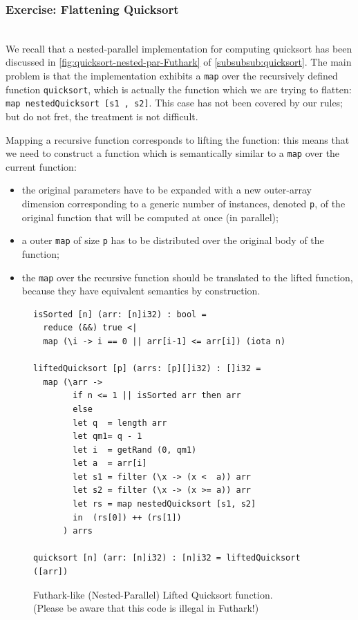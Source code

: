 \documentclass[acmsmall,review]{acmart}\settopmatter{printfolios=true,printccs=false,printacmref=false}
\begin{document}
\newpage
\subsubsection{Exercise: Flattening Quicksort}
\label{exercise:flat-quicksort}
$\mbox{ }$\\

We recall that a nested-parallel implementation for computing quicksort 
has been discussed in \cref{fig:quicksort-nested-par-Futhark}
of \cref{subsubsub:quicksort}.  The main problem is that the
implementation exhibits a \lstinline{map} over the recursively
defined function {\tt quicksort}, which is actually the function 
which we are trying to flatten: \lstinline{map nestedQuicksort [s1 , s2]}.
This case has not been covered by our rules; but do not fret,
the treatment is not difficult. 

Mapping a recursive function corresponds to lifting the function:
this means that we need to construct a function which is semantically
similar to a \lstinline{map} over the current function:
\begin{itemize}
    \item the original parameters have to be expanded with
        a new outer-array dimension corresponding to a generic
        number of instances, denoted {\tt p}, of the original
        function that will be computed at once (in parallel);
    \item a outer \lstinline{map} of size {\tt p} has to be
        distributed over the original body of the function;
    \item the \lstinline{map} over the recursive function
        should be translated to the lifted function, because
        they have equivalent semantics by construction.
\end{itemize}

\begin{figure}
\begin{lstlisting}[mathescape=true]
isSorted [n] (arr: [n]i32) : bool =
  reduce (&&) true <|
  map (\i -> i == 0 || arr[i-1] <= arr[i]) (iota n)

liftedQuicksort [p] (arrs: [p][]i32) : []i32 =
  map (\arr ->
        if n <= 1 || isSorted arr then arr
        else
        let q  = length arr
        let qm1= q - 1
        let i  = getRand (0, qm1)
        let a  = arr[i]
        let s1 = filter (\x -> (x <  a)) arr
        let s2 = filter (\x -> (x >= a)) arr
        let rs = map nestedQuicksort [s1, s2]
        in  (rs[0]) ++ (rs[1])
      ) arrs

quicksort [n] (arr: [n]i32) : [n]i32 = liftedQuicksort ([arr]) 
\end{lstlisting}\vspace{-4ex}
\caption{Futhark-like (Nested-Parallel) Lifted Quicksort function.\\
        (Please be aware that this code is illegal in Futhark!)}
\label{fig:lifted-nest-par-quicksort-Futhark}
\end{figure}
\end{document}
